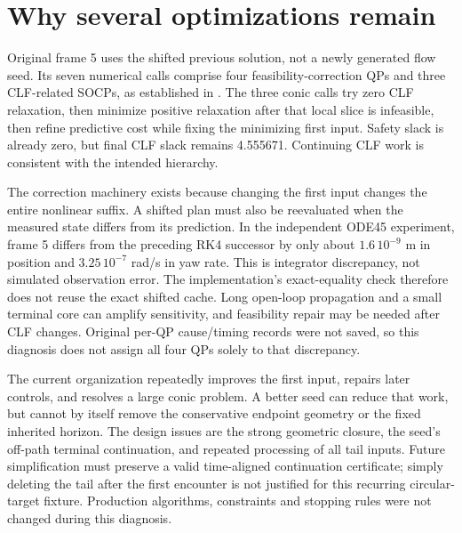 \documentclass[11pt]{article}
\begin{document}
\section{Why several optimizations remain}
Original frame 5 uses the shifted previous solution, not a newly generated
flow seed. Its seven numerical calls comprise four feasibility-correction QPs
and three CLF-related SOCPs, as established in
. The three conic calls try zero CLF relaxation,
then minimize positive relaxation after that local slice is infeasible, then
refine predictive cost while fixing the minimizing first input. Safety slack
is already zero, but final CLF slack remains 4.555671. Continuing CLF work is
consistent with the intended hierarchy.

The correction machinery exists because changing the first input changes the
entire nonlinear suffix. A shifted plan must also be reevaluated when the
measured state differs from its prediction. In the independent ODE45 experiment,
frame 5 differs from the preceding RK4 successor by only about $1.6\,10^{-9}$ m
in position and $3.25\,10^{-7}$ rad/s in yaw rate. This is integrator discrepancy,
not simulated observation error. The implementation's exact-equality check
therefore does not reuse the exact shifted cache. Long open-loop propagation
and a small terminal core can amplify sensitivity, and feasibility repair may
be needed after CLF changes. Original per-QP cause/timing records were not saved,
so this diagnosis does not assign all four QPs solely to that discrepancy.

The current organization repeatedly improves the first input, repairs later
controls, and resolves a large conic problem. A better seed can reduce that
work, but cannot by itself remove the conservative endpoint geometry or the
fixed inherited horizon. The design issues are the strong geometric closure,
the seed's off-path terminal continuation, and repeated processing of all tail
inputs. Future simplification must preserve a valid time-aligned continuation
certificate; simply deleting the tail after the first encounter is not justified
for this recurring circular-target fixture. Production algorithms, constraints
and stopping rules were not changed during this diagnosis.
\end{document}
